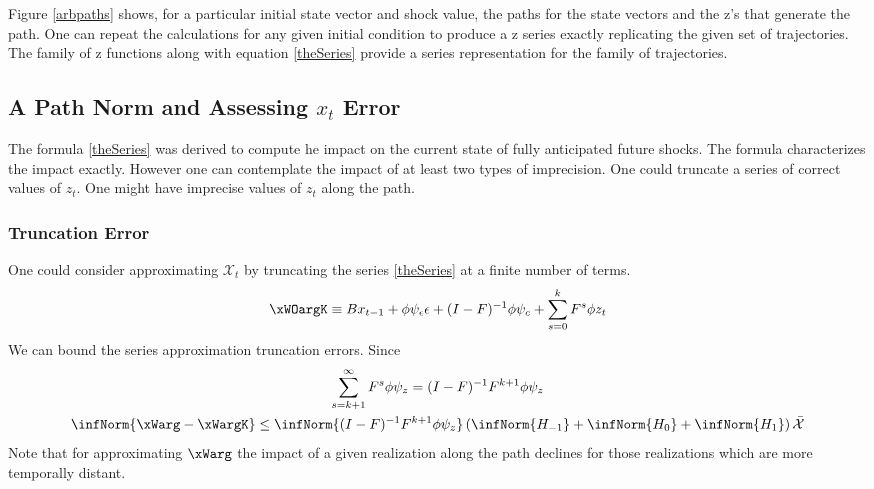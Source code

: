 \documentclass[12pt]{article}
\begin{document}



Figure \ref{arbpaths} shows, for a particular initial state vector and shock value,  the paths for the state vectors and the  z's that generate the path.
One can repeat the calculations for any given initial condition to produce
a z series exactly replicating the given set of trajectories.  The family
of z functions along with equation \ref{theSeries} provide a series 
representation for the family of trajectories. 





\subsection{A Path Norm and Assessing $x_t$ Error}
\label{sec:truncationerr}
The formula \ref{theSeries} was derived to compute he impact on the current state of fully anticipated future shocks.  The formula characterizes the impact exactly.  However one can contemplate the impact of at least two types of imprecision.  One could truncate a series of correct values of $z_t$.  One might have imprecise values of $z_t$ along the path.

\subsubsection{Truncation Error}


One could consider approximating $\mathcal{X}_t$ by 
truncating the series \ref{theSeries} at a finite number of terms.
 	 \begin{gather}
 	 \xWOargK \equiv B x_{t-1}+ \phi \psi_\epsilon\epsilon  + (I - F)^{-1} \phi \psi_c + \sum_{s=0}^k F^s \phi z_{t}\label{theTruncSeries}
 \end{gather}
We can bound the  series approximation truncation errors.
Since
    \begin{gather}
      \label{eq:1}
\sum_{s=k+1}^{\infty} F^s \phi \psi_z = (I -F)^{-1} F^{k+1}\phi \psi_z       \\
\infNorm{\xWarg-\xWargK} \le \infNorm{(I -F)^{-1} F^{k+1}\phi \psi_z} \left ( \infNorm{H_{-1} }+ \infNorm{H_{0} }+ \infNorm{H_{1} } \right )\bar{\mathcal{X}}
    \end{gather}
Note that for approximating $\xWarg$ the impact of  a given realization along the path declines for those realizations which are  more temporally distant.
\end{document}
